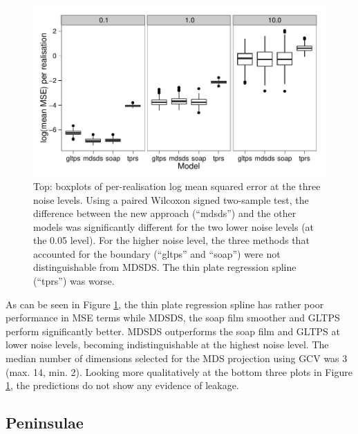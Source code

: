 \documentclass[useAMS, referee]{biom}
\begin{document}
\begin{figure}
\centering
\includegraphics[width=\textwidth]{examples/ramsay/ramsay-result.pdf}
\caption{Top: boxplots of per-realisation log mean squared error at the three noise levels. Using a paired Wilcoxon signed two-sample test, the difference between the new approach (``mdsds'') and the other models was significantly different for the two lower noise levels (at the 0.05 level). For the higher noise level, the three methods that accounted for the boundary (``gltps'' and ``soap'') were not distinguishable from MDSDS. The thin plate regression spline (``tprs'') was worse.
\label{ramsay-results}}
\end{figure}

As can be seen in Figure \ref{ramsay-results}, the thin plate regression spline has rather poor performance in MSE terms while MDSDS, the soap film smoother and GLTPS perform significantly better. MDSDS outperforms the soap film and GLTPS at lower noise levels, becoming indistinguishable at the highest noise level. The median number of dimensions selected for the MDS projection using GCV was 3 (max. 14, min. 2). Looking more qualitatively at the bottom three plots in Figure \ref{ramsay-results}, the predictions do not show any evidence of leakage.


\subsection{Peninsulae}
\end{document}
